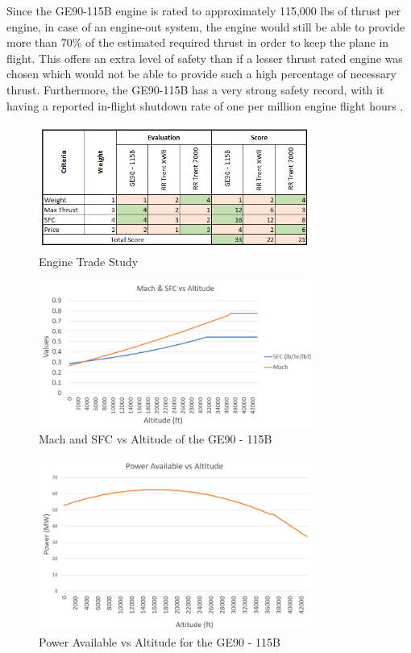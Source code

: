 Since the GE90-115B engine is rated to approximately 115,000 lbs of thrust per engine, in case of an engine-out system, the engine would still be able to provide more than 70\% of the estimated required thrust in order to keep the plane in flight. This offers an extra level of safety than if a lesser thrust rated engine was chosen which would not be able to provide such a high percentage of necessary thrust. Furthermore, the GE90-115B has a very strong safety record, with it having a reported in-flight shutdown rate of one per million engine flight hours \cite{geifsd}. 

\begin{figure} [h!]
    \centering
    \includegraphics[width=0.8\textwidth]{Photos/GE90Trade.PNG}
    \caption{Engine Trade Study}
    \label{fig:enginetrade}
\end{figure}

\begin{figure} [h!]
    \centering
    \includegraphics[width=0.8\textwidth]{Photos/machvssfc.PNG}
    \caption{Mach and SFC vs Altitude of the GE90 - 115B}
    \label{fig:machvssfc}
\end{figure}

\begin{figure} [h!]
    \centering
    \includegraphics[width=0.8\textwidth]{Photos/powervsaltitude.PNG}
    \caption{Power Available vs Altitude for the GE90 - 115B}
    \label{fig:poweravailable}
\end{figure}

